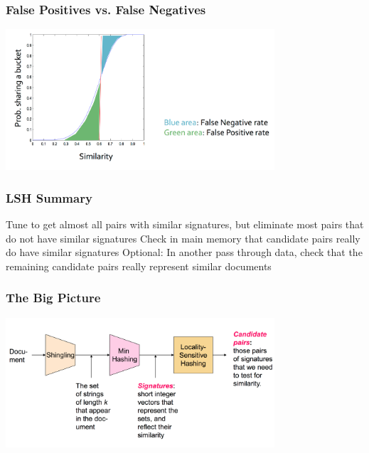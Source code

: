 \documentclass[svgnames]{beamer}
\begin{document}
  
\begin{frame} \frametitle{False Positives vs. False Negatives}

\includegraphics[width=10cm]{tradeoff}

\end{frame}

  
\begin{frame} \frametitle{LSH Summary}

Tune to get almost all pairs with similar signatures, but eliminate most pairs that do not have similar signatures
Check in main memory that candidate pairs really do have similar signatures
Optional: In another pass through data, check that the remaining candidate pairs really represent similar documents

\end{frame}

  
\begin{frame} \frametitle{The Big Picture}

\includegraphics[width=10cm]{overall}

\end{frame}


\end{document}
